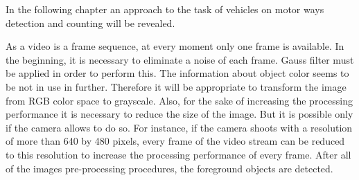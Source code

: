 \documentclass[12pt,a4paper,oneside,titlepage]{article}
\begin{document}
In the following chapter an approach to the task of vehicles on motor ways detection and counting will be revealed.

As a video is a frame sequence, at every moment only one frame is available.
In the beginning, it is necessary to eliminate a noise of each frame.
Gauss filter must be applied in order to perform this.
The information about object color seems to be not in use in further.
Therefore it will be appropriate to transform the image from RGB color space to grayscale.
Also, for the sake of increasing the processing performance it is necessary to reduce the size of the image.
But it is possible only if the camera allows to do so.
For instance, if the camera shoots with a resolution of more than 640 by 480 pixels, every frame of the video stream can be reduced to this resolution to increase the processing performance of every frame.
After all of the images pre-processing procedures, the foreground objects are detected.
\end{document}
